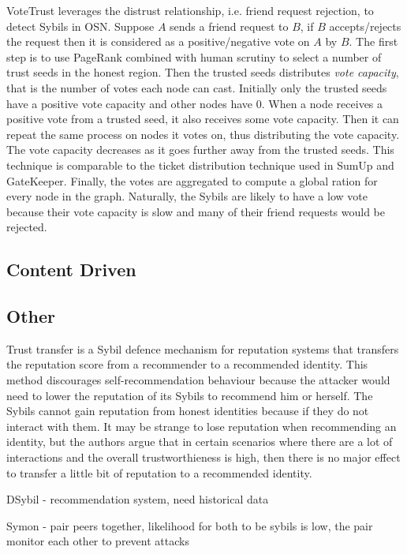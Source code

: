 VoteTrust\cite{xue2013votetrust} leverages the distrust relationship, i.e.
friend request rejection, to detect Sybils in OSN. Suppose $A$ sends a friend
request to $B$, if $B$ accepts/rejects the request then it is considered as a
positive/negative vote on $A$ by $B$. The first step is to use PageRank combined
with human scrutiny to select a number of trust seeds in the honest region. Then
the trusted seeds distributes \emph{vote capacity}, that is the number of votes
each node can cast. Initially only the trusted seeds have a positive vote
capacity and other nodes have 0. When a node receives a positive vote from a
trusted seed, it also receives some vote capacity. Then it can repeat the same
process on nodes it votes on, thus distributing the vote capacity. The vote
capacity decreases as it goes further away from the trusted seeds. This
technique is comparable to the ticket distribution technique used in SumUp and
GateKeeper. Finally, the votes are aggregated to compute a global ration for
every node in the graph. Naturally, the Sybils are likely to have a low vote
because their vote capacity is slow and many of their friend requests would be
rejected.

\subsection{Content Driven}
\cite{chatterjee2008robust}

\subsection{Other}
Trust transfer\cite{seigneur2005trust} is a Sybil defence mechanism for
reputation systems that transfers the reputation score from a recommender to a
recommended identity. This method discourages self-recommendation behaviour
because the attacker would need to lower the reputation of its Sybils to
recommend him or herself. The Sybils cannot gain reputation from honest
identities because if they do not interact with them. It may be strange to lose
reputation when recommending an identity, but the authors argue that in certain
scenarios where there are a lot of interactions and the overall trustworthieness
is high, then there is no major effect to transfer a little bit of reputation to
a recommended identity.

DSybil\cite{yu2009dsybil} - recommendation system, need historical data

Symon\cite{jyothi2009symon} - pair peers together, likelihood for both to be sybils is low, the pair monitor each other to prevent attacks

